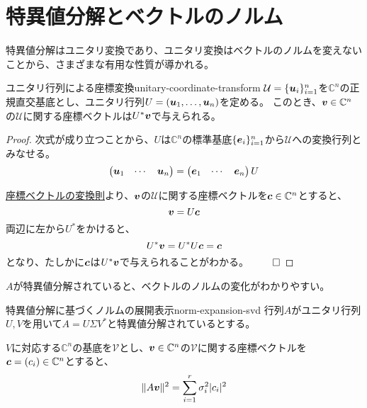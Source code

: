 \documentclass[../../../topic_linear-algebra]{subfiles}
\begin{document}
\sectionline
\section{特異値分解とベクトルのノルム}

特異値分解はユニタリ変換であり、ユニタリ変換はベクトルのノルムを変えないことから、さまざまな有用な性質が導かれる。

\begin{theorem}{ユニタリ行列による座標変換}{unitary-coordinate-transform}
  $\mathcal{U} = \{ \vb*{u}_i \}_{i=1}^n$を$\mathbb{C}^n$の正規直交基底とし、ユニタリ行列$U = (\vb*{u}_1, \ldots, \vb*{u}_n)$を定める。
  このとき、$\vb*{v} \in \mathbb{C}^n$の$\mathcal{U}$に関する座標ベクトルは$U^*\vb*{v}$で与えられる。
\end{theorem}

\begin{proof}
  次式が成り立つことから、$U$は$\mathbb{C}^n$の標準基底$\{ \vb*{e}_i \}_{i=1}^n$から$\mathcal{U}$への変換行列とみなせる。
  \begin{equation*}
    \begin{pmatrix}
      \vb*{u}_1 & \cdots & \vb*{u}_n
    \end{pmatrix} = \begin{pmatrix}
      \vb*{e}_1 & \cdots & \vb*{e}_n
    \end{pmatrix} U
  \end{equation*}
  
  \hyperref[thm:coordinate-change-rule]{座標ベクトルの変換則}より、$\vb*{v}$の$\mathcal{U}$に関する座標ベクトルを$\vb*{c} \in \mathbb{C}^n$とすると、
  \begin{equation*}
    \vb*{v} = U \vb*{c}
  \end{equation*}
  両辺に左から$U^*$をかけると、
  \begin{equation*}
    U^* \vb*{v} = U^* U \vb*{c} = \vb*{c}
  \end{equation*}
  となり、たしかに$\vb*{c}$は$U^* \vb*{v}$で与えられることがわかる。 $\qed$
\end{proof}

\br

$A$が特異値分解されていると、ベクトルのノルムの変化がわかりやすい。

\begin{theorem}{特異値分解に基づくノルムの展開表示}{norm-expansion-svd}
  行列$A$がユニタリ行列$U,V$を用いて$A = U \Sigma V^*$と特異値分解されているとする。
  
  $V$に対応する$\mathbb{C}^n$の基底を$\mathcal{V}$とし、$\vb*{v} \in \mathbb{C}^n$の$\mathcal{V}$に関する座標ベクトルを$\vb*{c} = (c_i) \in \mathbb{C}^n$とすると、
  \begin{equation*}
    \| A \vb*{v} \|^2 = \sum_{i=1}^r \sigma_i^2 |c_i|^2
  \end{equation*}
\end{theorem}
\end{document}
